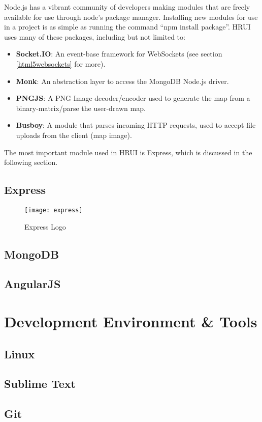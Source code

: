 Node.js has a vibrant community of developers making modules that are freely available for use through node's package manager. Installing new modules for use in a project is as simple as running the command ``npm install package''. HRUI uses many of these packages, including but not limited to:
\begin{itemize}
  \item \textbf{Socket.IO}: An event-base framework for WebSockets (see section \ref{html5websockets} for more).
  \item \textbf{Monk}: An abstraction layer to access the MongoDB Node.js driver.
  \item \textbf{PNGJS}: A PNG Image decoder/encoder used to generate the map from a binary-matrix/parse the user-drawn map.
  \item \textbf{Busboy}: A module that parses incoming HTTP requests, used to accept file uploads from the client (map image).
\end{itemize}
The most important module used in HRUI is Express, which is discussed in the following section.
\subsection{Express}
\begin{figure}[H]
    \begin{center}
      \texttt{[image: express]}
    \end{center}
    \caption{Express Logo}
  \end{figure}
\subsection{MongoDB}
\subsection{AngularJS} \label{AngularJS}

\section{Development Environment \& Tools}
\subsection{Linux}
\subsection{Sublime Text}
\subsection{Git}

